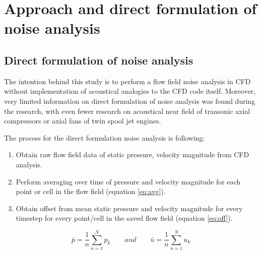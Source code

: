 
\chapter{Approach and direct formulation of noise analysis} %
\label{approach} %


\section{Direct formulation of noise analysis} \label{direct_approach}
The intention behind this study is to perform a flow field noise analysis in CFD without implementation of acoustical analogies to the CFD code itself. Moreover, very limited information on direct formulation of noise analysis was found during the research, with even fewer research on acoustical near field of transonic axial compressors or axial fans of twin spool jet engines.

The process for the direct formulation noise analysis is following:
\begin{enumerate}
\item Obtain raw flow field data of static pressure, velocity magnitude from CFD analysis.
\item Perform averaging over time of pressure and velocity magnitude for each point or cell in the flow field (equation \ref{eq:avg}).
\item Obtain offset from mean static pressure and velocity magnitude for every timestep for every point/cell in the saved flow field (equation \ref{eq:off}).		
\end{enumerate}


\begin{equation} \label{eq:avg}
\bar{p} = \frac{1}{n} \sum_{n=1}^{N} p_k \qquad and \qquad \bar{u} = \frac{1}{n} \sum_{n=1}^{N} u_k
\end{equation}

